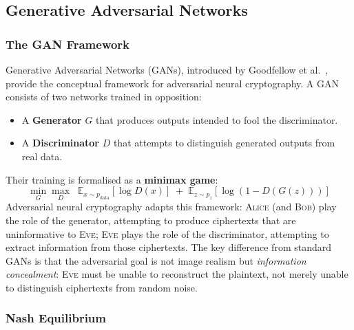 \documentclass[12pt, a4paper]{article}
\newcommand{\alice}{\textsc{Alice}}
\newcommand{\bob}{\textsc{Bob}}
\newcommand{\eve}{\textsc{Eve}}
\begin{document}
\subsection{Generative Adversarial Networks}
\label{subsec:gans}

\subsubsection*{The GAN Framework}

Generative Adversarial Networks (GANs), introduced by Goodfellow et
al.~\cite{goodfellow2014generative}, provide the conceptual framework
for adversarial neural cryptography. A GAN consists of two networks
trained in opposition:

\begin{itemize}[leftmargin=1.8em, itemsep=4pt]
  \item A \textbf{Generator} $G$ that produces outputs intended to fool
        the discriminator.
  \item A \textbf{Discriminator} $D$ that attempts to distinguish
        generated outputs from real data.
\end{itemize}

\noindent Their training is formalised as a \textbf{minimax game}:
%
\begin{equation}
  \min_G \max_D \;\;
  \mathbb{E}_{x \sim p_{\text{data}}}[\log D(x)]
  \;+\;
  \mathbb{E}_{z \sim p_z}[\log(1 - D(G(z)))]
  \label{eq:gan_minimax}
\end{equation}
%
Adversarial neural cryptography adapts this framework: \alice{} (and
\bob{}) play the role of the generator, attempting to produce ciphertexts
that are uninformative to \eve{}; \eve{} plays the role of the
discriminator, attempting to extract information from those ciphertexts.
The key difference from standard GANs is that the adversarial goal is
not image realism but \emph{information concealment}: \eve{} must be
unable to reconstruct the plaintext, not merely unable to distinguish
ciphertexts from random noise.

\subsubsection*{Nash Equilibrium}
\end{document}
